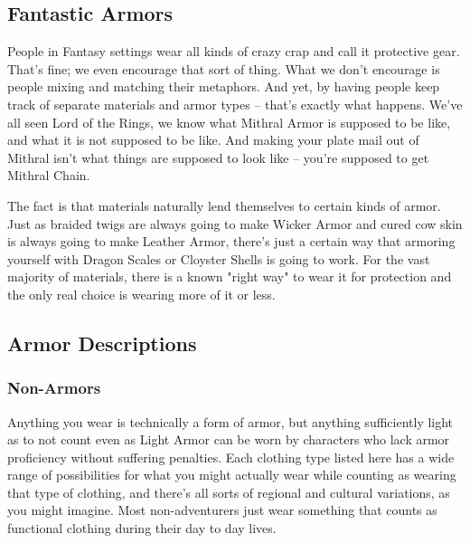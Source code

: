 \subsection{Fantastic Armors}

People in Fantasy settings wear all kinds of crazy crap and call it protective gear. That's fine; we even encourage that sort of thing. What we don't encourage is people mixing and matching their metaphors. And yet, by having people keep track of separate materials and armor types -- that's exactly what happens. We've all seen Lord of the Rings, we know what Mithral Armor is supposed to be like, and what it is not supposed to be like. And making your plate mail out of Mithral isn't what things are supposed to look like -- you're supposed to get Mithral Chain.

The fact is that materials naturally lend themselves to certain kinds of armor. Just as braided twigs are always going to make Wicker Armor and cured cow skin is always going to make Leather Armor, there's just a certain way that armoring yourself with Dragon Scales or Cloyster Shells is going to work. For the vast majority of materials, there is a known "right way" to wear it for protection and the only real choice is wearing more of it or less.

\subsection{Armor Descriptions}

\subsubsection{Non-Armors}

Anything you wear is technically a form of armor, but anything sufficiently light as to not count even as Light Armor can be worn by characters who lack armor proficiency without suffering penalties. Each clothing type listed here has a wide range of possibilities for what you might actually wear while counting as wearing that type of clothing, and there's all sorts of regional and cultural variations, as you might imagine. Most non-adventurers just wear something that counts as functional clothing during their day to day lives.

